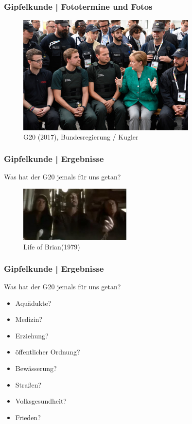 \documentclass[]{beamer}
\begin{document}
	\begin{frame}
	\frametitle{Gipfelkunde | Fototermine und Fotos}
	\begin{figure}[h!]
		\renewcommand{\figurename}{Foto} 
		\includegraphics[width=0.8\textwidth]{images/fotos_09_BundesregierungKugler}
		\caption{G20 (2017), Bundesregierung / Kugler}
	\end{figure}
	\end{frame}

	\begin{frame}
		\frametitle{Gipfelkunde | Ergebnisse}
		Was hat der G20 jemals für uns getan?
		\begin{figure}[h!]
			\renewcommand{\figurename}{Foto} 
			\includegraphics[width=0.5\textwidth]{images/was-hat-die-g20-je-fuer-uns-getan.jpg}
			\caption{Life of Brian(1979)}
		\end{figure}
	\end{frame}

	\begin{frame}
	\frametitle{Gipfelkunde | Ergebnisse}
	Was hat der G20 jemals für uns getan?
	\begin{itemize}
		\item Aquädukte?
		\item Medizin?
		\item Erziehung?
		\item öffentlicher Ordnung?
		\item Bewässerung?
		\item Straßen?
		\item Volksgesundheit?
		\item Frieden?
	\end{itemize}
	\end{frame}
\end{document}
